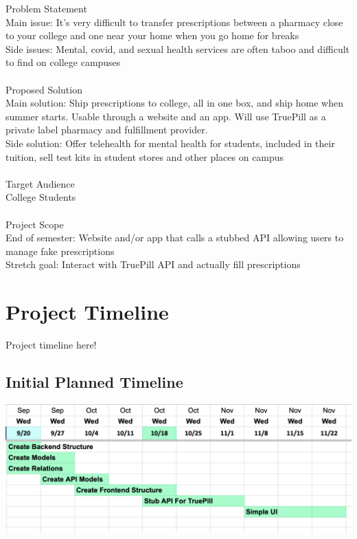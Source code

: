 \documentclass[12pt, a4paper,oneside]{book}
\numberwithin{equation}{section}
\begin{document}
{\large Problem Statement}\\
Main issue: It's very difficult to transfer prescriptions between a pharmacy close to your college and one near your home when you go home for breaks\\
Side issues: Mental, covid, and sexual health services are often taboo and difficult to find on college campuses
\\\\{\large Proposed Solution}\\
Main solution: Ship prescriptions to college, all in one box, and ship home when summer starts. Usable through a website and an app. Will use TruePill as a private label pharmacy and fulfillment provider.\\
Side solution: Offer telehealth for mental health for students, included in their tuition, sell test kits in student stores and other places on campus
\\\\{\large Target Audience}\\
College Students
\\\\{\large Project Scope}\\
End of semester: Website and/or app that calls a stubbed API allowing users to manage fake prescriptions\\
Stretch goal: Interact with TruePill API and actually fill prescriptions


\chapter{Project Timeline}

Project timeline here!

\section{Initial Planned Timeline}

\includegraphics[scale=0.7]{orig_timeline.png} %
\end{document}
